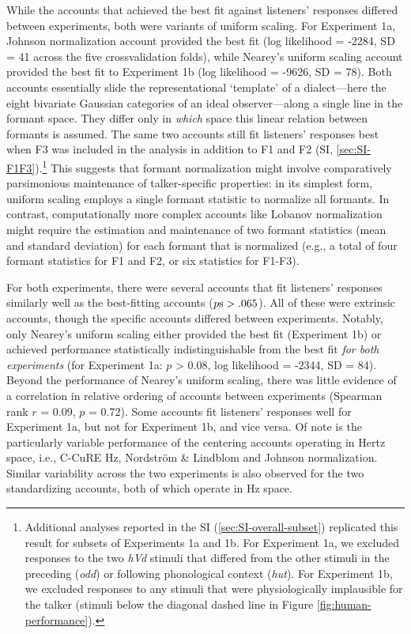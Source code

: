 \documentclass[preprint]{JASA}
\begin{document}
While the accounts that achieved the best fit against listeners' responses differed between experiments, both were variants of uniform scaling. For Experiment 1a, Johnson normalization account provided the best fit (log likelihood = -2284, SD = 41 across the five crossvalidation folds), while Nearey's uniform scaling account provided the best fit to Experiment 1b (log likelihood = -9626, SD = 78). Both accounts essentially slide the representational `template' of a dialect---here the eight bivariate Gaussian categories of an ideal observer---along a single line in the formant space. They differ only in \emph{which} space this linear relation between formants is assumed. The same two accounts still fit listeners' responses best when F3 was included in the analysis in addition to F1 and F2 (SI, \ref{sec:SI-F1F3}).\footnote{Additional analyses reported in the SI (\ref{sec:SI-overall-subset}) replicated this result for subsets of Experiments 1a and 1b. For Experiment 1a, we excluded responses to the two \emph{hVd} stimuli that differed from the other stimuli in the preceding (\emph{odd}) or following phonological context (\emph{hut}). For Experiment 1b, we excluded responses to any stimuli that were physiologically implausible for the talker (stimuli below the diagonal dashed line in Figure \ref{fig:human-performance}).} This suggests that formant normalization might involve comparatively parsimonious maintenance of talker-specific properties: in its simplest form, uniform scaling employs a single formant statistic to normalize all formants. In contrast, computationally more complex accounts like Lobanov normalization might require the estimation and maintenance of two formant statistics (mean and standard deviation) for each formant that is normalized (e.g., a total of four formant statistics for F1 and F2, or six statistics for F1-F3).

For both experiments, there were several accounts that fit listeners' responses similarly well as the best-fitting accounts (\(p{\rm s} > .065\)). All of these were extrinsic accounts, though the specific accounts differed between experiments. Notably, only Nearey's uniform scaling either provided the best fit (Experiment 1b) or achieved performance statistically indistinguishable from the best fit \emph{for both experiments} (for Experiment 1a: \(p\) \textgreater{} 0.08, log likelihood = -2344, SD = 84). Beyond the performance of Nearey's uniform scaling, there was little evidence of a correlation in relative ordering of accounts between experiments (Spearman rank \(r\) = 0.09, \(p\) = 0.72). Some accounts fit listeners' responses well for Experiment 1a, but not for Experiment 1b, and vice versa. Of note is the particularly variable performance of the centering accounts operating in Hertz space, i.e., C-CuRE Hz, Nordström \& Lindblom and Johnson normalization. Similar variability across the two experiments is also observed for the two standardizing accounts, both of which operate in Hz space.
\end{document}
